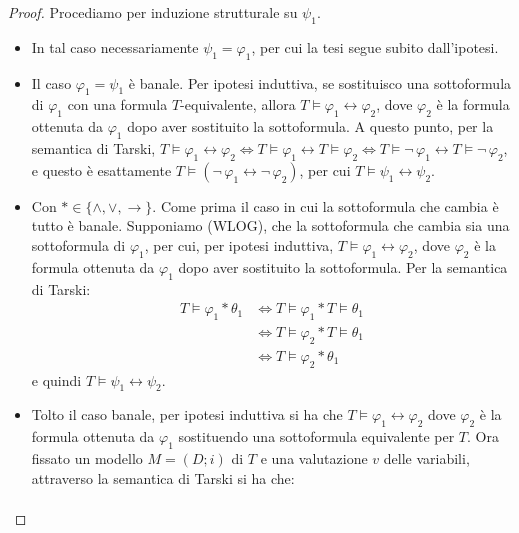\begin{proof}
    Procediamo per induzione strutturale su $\psi_1$.
    \begin{itemize}
        \item[$\boxed{\text{$\psi_1$ atomica}}$] In tal caso necessariamente $\psi_1 = \varphi_1$, per cui la tesi segue subito dall'ipotesi.
        \item[$\boxed{\text{$\psi_1 = \neg\, \varphi_1$}}$] Il caso $\varphi_1 = \psi_1$ è banale. Per ipotesi induttiva, se sostituisco una sottoformula di $\varphi_1$ con una formula $T$-equivalente, allora $T \models \varphi_1 \leftrightarrow \varphi_2$, dove $\varphi_2$ è la formula ottenuta da $\varphi_1$ dopo aver sostituito la sottoformula. 
        A questo punto, per la semantica di Tarski, $T \models \varphi_1 \leftrightarrow \varphi_2 \iff T \models \varphi_1 \leftrightarrow T \models\varphi_2 \iff T \models \neg\, \varphi_1 \leftrightarrow T \models\neg\, \varphi_2$, e questo è esattamente $T \models (\neg\, \varphi_1 \leftrightarrow \neg\, \varphi_2)$, per cui $T \models \psi_1 \leftrightarrow \psi_2$.
        \item[$\boxed{\text{$\psi_1 = \varphi_1 * \theta_1$}}$] Con  $* \in \{\land, \lor, \to\}$. Come prima il caso in cui la sottoformula che cambia è tutto è banale. Supponiamo (WLOG), che la sottoformula che cambia sia una sottoformula di $\varphi_1$, per cui, per ipotesi induttiva, $T \models \varphi_1 \leftrightarrow \varphi_2$, dove $\varphi_2$ è la formula ottenuta da $\varphi_1$ dopo aver sostituito la sottoformula.
        Per la semantica di Tarski:
        \begin{align*}
            T \models \varphi_1 * \theta_1 &\iff T \models \varphi_1 * T \models \theta_1 \\
                                           &\iff T \models \varphi_2 * T \models \theta_1 \\
                                           &\iff T \models \varphi_2 * \theta_1
        \end{align*}
        e quindi $T \models \psi_1 \leftrightarrow \psi_2$.
        \item[$\boxed{\text{$\psi_1 = \forall x_k \, \varphi_1$}}$] Tolto il caso banale, per ipotesi induttiva si ha che $T \models \varphi_1 \leftrightarrow \varphi_2$ dove $\varphi_2$ è la formula ottenuta da $\varphi_1$ sostituendo una sottoformula equivalente per $T$.
        Ora fissato un modello $M = (D;i)$ di $T$ e una valutazione $v$ delle variabili, attraverso la semantica di Tarski si ha che:
        \begin{align*}

\end{align*}
\end{itemize}
\end{proof}
